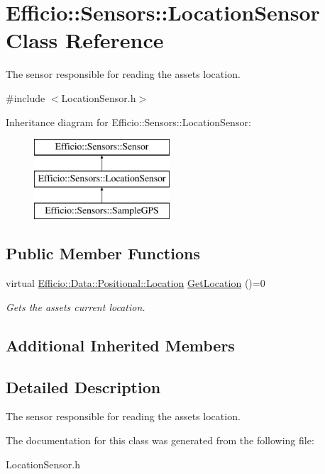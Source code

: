 \hypertarget{class_efficio_1_1_sensors_1_1_location_sensor}{}\section{Efficio\+:\+:Sensors\+:\+:Location\+Sensor Class Reference}
\label{class_efficio_1_1_sensors_1_1_location_sensor}


The sensor responsible for reading the asset\textquotesingle{}s location.  




{\ttfamily \#include $<$Location\+Sensor.\+h$>$}

Inheritance diagram for Efficio\+:\+:Sensors\+:\+:Location\+Sensor\+:\begin{figure}[H]
\begin{center}
\leavevmode
\includegraphics[height=3.000000cm]{class_efficio_1_1_sensors_1_1_location_sensor}
\end{center}
\end{figure}
\subsection*{Public Member Functions}
\begin{DoxyCompactItemize}
\item 
virtual \hyperlink{class_efficio_1_1_data_1_1_positional_1_1_location}{Efficio\+::\+Data\+::\+Positional\+::\+Location} \hyperlink{class_efficio_1_1_sensors_1_1_location_sensor_ac23c09fc9564d0c1e93f2fe2e4695463}{Get\+Location} ()=0\hypertarget{class_efficio_1_1_sensors_1_1_location_sensor_ac23c09fc9564d0c1e93f2fe2e4695463}{}\label{class_efficio_1_1_sensors_1_1_location_sensor_ac23c09fc9564d0c1e93f2fe2e4695463}

\begin{DoxyCompactList}\small\item\em Gets the asset\textquotesingle{}s current location. \end{DoxyCompactList}\end{DoxyCompactItemize}
\subsection*{Additional Inherited Members}


\subsection{Detailed Description}
The sensor responsible for reading the asset\textquotesingle{}s location. 

The documentation for this class was generated from the following file\+:\begin{DoxyCompactItemize}
\item 
Location\+Sensor.\+h\end{DoxyCompactItemize}
